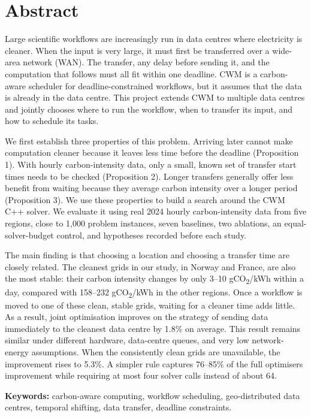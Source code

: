 \documentclass[12pt,a4paper,oneside,openany]{report}
\begin{document}
\chapter*{Abstract}
Large scientific workflows are increasingly run in data centres where
electricity is cleaner. When the input is very large, it must first be
transferred over a wide-area network (WAN). The transfer, any delay
before sending it, and the computation that follows must all fit within
one deadline. CWM is a carbon-aware scheduler for deadline-constrained
workflows, but it assumes that the data is already in the data centre.
This project extends CWM to multiple data centres and jointly chooses
where to run the workflow, when to transfer its input, and how to
schedule its tasks.

We first establish three properties of this problem. Arriving later
cannot make computation cleaner because it leaves less time before the
deadline (Proposition 1). With hourly carbon-intensity data, only a
small, known set of transfer start times needs to be checked
(Proposition 2). Longer transfers generally offer less benefit from
waiting because they average carbon intensity over a longer period
(Proposition 3). We use these properties to build a search around the
CWM C++ solver. We evaluate it using real 2024 hourly carbon-intensity
data from five regions, close to 1,000 problem instances, seven
baselines, two ablations, an equal-solver-budget control, and hypotheses
recorded before each study.

The main finding is that choosing a location and choosing a transfer
time are closely related. The cleanest grids in our study, in Norway and
France, are also the most stable: their carbon intensity changes by only
3--10 gCO\textsubscript{2}/kWh within a day, compared with 158--232 gCO\textsubscript{2}/kWh in the
other regions. Once a workflow is moved to one of these clean, stable
grids, waiting for a cleaner time adds little. As a result, joint
optimisation improves on the strategy of sending data immediately to the
cleanest data centre by 1.8\% on average. This result remains similar
under different hardware, data-centre queues, and very low
network-energy assumptions. When the consistently clean grids are
unavailable, the improvement rises to 5.3\%. A simpler rule captures
76--85\% of the full optimiser\textquotesingle s improvement while
requiring at most four solver calls instead of about 64.

\textbf{Keywords:} carbon-aware computing, workflow scheduling,
geo-distributed data centres, temporal shifting, data transfer, deadline
constraints.
\end{document}
